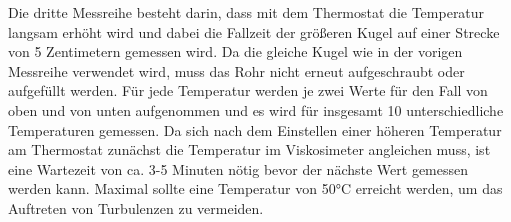 %
Die dritte Messreihe besteht darin, dass mit dem Thermostat die Temperatur langsam erhöht wird
und dabei die Fallzeit der größeren Kugel auf einer Strecke von 5 Zentimetern gemessen wird.
Da die gleiche Kugel wie in der vorigen Messreihe verwendet wird, muss das Rohr nicht erneut aufgeschraubt oder aufgefüllt werden.
Für jede Temperatur werden je zwei Werte für den Fall von oben und von unten aufgenommen und es wird für insgesamt 10 unterschiedliche Temperaturen gemessen.
Da sich nach dem Einstellen einer höheren Temperatur am Thermostat zunächst die Temperatur im Viskosimeter angleichen muss, 
ist eine Wartezeit von ca. 3-5 Minuten nötig bevor der nächste Wert gemessen werden kann.
 Maximal sollte eine Temperatur von 50°C erreicht werden, um das Auftreten von Turbulenzen zu vermeiden.
